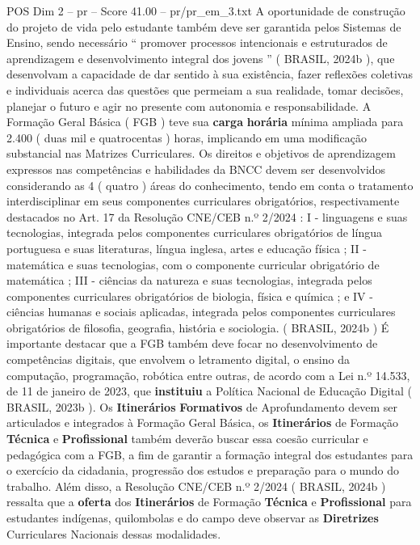 \begin{textsample}{POS Dim 2 – pr – Score 41.00 – pr/pr\_em\_3.txt}
A oportunidade de construção do projeto de vida pelo estudante também deve ser garantida pelos Sistemas de Ensino, sendo necessário “ promover processos intencionais e estruturados de aprendizagem e desenvolvimento integral dos jovens ” ( BRASIL, 2024b ), que desenvolvam a capacidade de dar sentido à sua existência, fazer reflexões coletivas e individuais acerca das questões que permeiam a sua realidade, tomar decisões, planejar o futuro e agir no presente com autonomia e responsabilidade.
A Formação Geral Básica ( FGB ) teve sua \textbf{carga} \textbf{horária} mínima ampliada para 2.400 ( duas mil e quatrocentas ) horas, implicando em uma modificação substancial nas Matrizes Curriculares.
Os direitos e objetivos de aprendizagem expressos nas competências e habilidades da BNCC devem ser desenvolvidos considerando as 4 ( quatro ) áreas do conhecimento, tendo em conta o tratamento interdisciplinar em seus componentes curriculares obrigatórios, respectivamente destacados no Art. 17 da Resolução CNE/CEB n.º 2/2024 : I - linguagens e suas tecnologias, integrada pelos componentes curriculares obrigatórios de língua portuguesa e suas literaturas, língua inglesa, artes e educação física ; II - matemática e suas tecnologias, com o componente curricular obrigatório de matemática ; III - ciências da natureza e suas tecnologias, integrada pelos componentes curriculares obrigatórios de biologia, física e química ; e IV - ciências humanas e sociais aplicadas, integrada pelos componentes curriculares obrigatórios de filosofia, geografia, história e sociologia. ( BRASIL, 2024b ) É importante destacar que a FGB também deve focar no desenvolvimento de competências digitais, que envolvem o letramento digital, o ensino da computação, programação, robótica entre outras, de acordo com a Lei n.º 14.533, de 11 de janeiro de 2023, que \textbf{instituiu} a Política Nacional de Educação Digital ( BRASIL, 2023b ).
Os \textbf{Itinerários} \textbf{Formativos} de Aprofundamento devem ser articulados e integrados à Formação Geral Básica, os \textbf{Itinerários} de Formação \textbf{Técnica} e \textbf{Profissional} também deverão buscar essa coesão curricular e pedagógica com a FGB, a fim de garantir a formação integral dos estudantes para o exercício da cidadania, progressão dos estudos e preparação para o mundo do trabalho.
Além disso, a Resolução CNE/CEB n.º 2/2024 ( BRASIL, 2024b ) ressalta que a \textbf{oferta} dos \textbf{Itinerários} de Formação \textbf{Técnica} e \textbf{Profissional} para estudantes indígenas, quilombolas e do campo deve observar as \textbf{Diretrizes} Curriculares Nacionais dessas modalidades.

\end{textsample}
